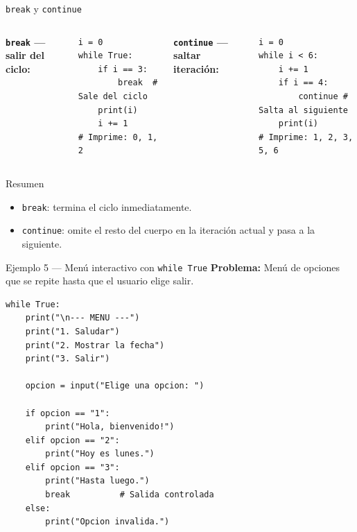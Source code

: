 \documentclass[aspectratio=169,xcolor=dvipsnames]{beamer}
\begin{document}
\begin{frame}[fragile]{\texttt{break} y \texttt{continue}}
    \begin{columns}
        \textbf{\texttt{break} --- salir del ciclo:}
\begin{lstlisting}[style=PythonStyle]
i = 0
while True:
    if i == 3:
        break  # Sale del ciclo
    print(i)
    i += 1
# Imprime: 0, 1, 2
\end{lstlisting}

        \textbf{\texttt{continue} --- saltar iteraci\'on:}
\begin{lstlisting}[style=PythonStyle]
i = 0
while i < 6:
    i += 1
    if i == 4:
        continue # Salta al siguiente
    print(i)
# Imprime: 1, 2, 3, 5, 6
\end{lstlisting}
    \end{columns}

    \vspace{0.3cm}
    \begin{block}{Resumen}
        \begin{itemize}
            \item \texttt{break}: termina el ciclo inmediatamente.
            \item \texttt{continue}: omite el resto del cuerpo en la iteraci\'on actual y pasa a la siguiente.
        \end{itemize}
    \end{block}
\end{frame}

\begin{frame}[fragile]{Ejemplo 5 --- Men\'u interactivo con \texttt{while True}}
    \textbf{Problema:} Men\'u de opciones que se repite hasta que el usuario elige salir.

\begin{lstlisting}[style=PythonStyle]
while True:
    print("\n--- MENU ---")
    print("1. Saludar")
    print("2. Mostrar la fecha")
    print("3. Salir")

    opcion = input("Elige una opcion: ")

    if opcion == "1":
        print("Hola, bienvenido!")
    elif opcion == "2":
        print("Hoy es lunes.")
    elif opcion == "3":
        print("Hasta luego.")
        break          # Salida controlada
    else:
        print("Opcion invalida.")
\end{lstlisting}
\end{frame}
\end{document}
